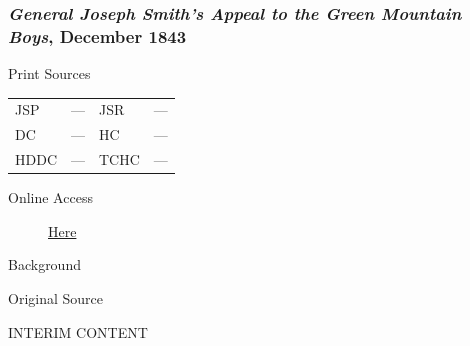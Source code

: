		\subsubsection{\textit{General Joseph Smith's Appeal to the Green Mountain Boys}, December 1843}
			\label{EMS-1843-JS-DEC-1843}
		
			\begin{description}
				\item[Print Sources]
			\end{description}

				\begin{tabular}{p{0.5in}p{1in}p{0.5in}p{1in}}
				JSP	 	& ---		& JSR 		& --- \\
				DC	 	& ---		& HC 		& --- \\
				HDDC 	& ---		& TCHC 		& --- \\
				\end{tabular}
			
			\begin{description}
				\item[Online Access] \href{https://www.josephsmithpapers.org/paper-summary/general-joseph-smiths-appeal-to-the-green-mountain-boys-december-1843/1}{Here}
			\end{description}
			
			\begin{description}
				\item[Background]
			\end{description}
			
			
			\begin{description}
				\item[Original Source]
			\end{description}
			
				INTERIM CONTENT
			
			
